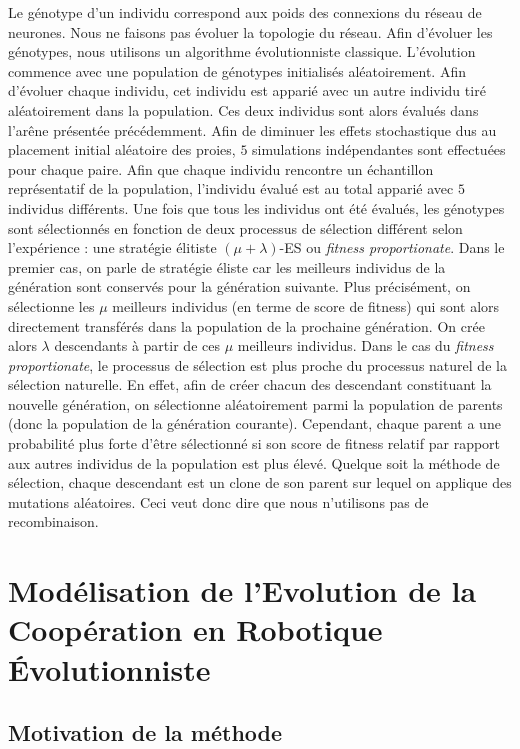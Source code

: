    	Le génotype d'un individu correspond aux poids des connexions du réseau de neurones. Nous ne faisons pas évoluer la topologie du réseau. Afin d'évoluer les génotypes, nous utilisons un algorithme évolutionniste classique. L'évolution commence avec une population de génotypes initialisés aléatoirement. Afin d'évoluer chaque individu, cet individu est apparié avec un autre individu tiré aléatoirement dans la population. Ces deux individus sont alors évalués dans l'arêne présentée précédemment. Afin de diminuer les effets stochastique dus au placement initial aléatoire des proies, $5$ simulations indépendantes sont effectuées pour chaque paire. Afin que chaque individu rencontre un échantillon représentatif de la population, l'individu évalué est au total apparié avec $5$ individus différents. Une fois que tous les individus ont été évalués, les génotypes sont sélectionnés en fonction de deux processus de sélection différent selon l'expérience : une stratégie élitiste \((\mu+\lambda)\)-ES ou \emph{fitness proportionate}. Dans le premier cas, on parle de stratégie éliste car les meilleurs individus de la génération sont conservés pour la génération suivante. Plus précisément, on sélectionne les $\mu$ meilleurs individus (en terme de score de fitness) qui sont alors directement transférés dans la population de la prochaine génération. On crée alors $\lambda$ descendants à partir de ces $\mu$ meilleurs individus. Dans le cas du \emph{fitness proportionate}, le processus de sélection est plus proche du processus naturel de la sélection naturelle. En effet, afin de créer chacun des descendant constituant la nouvelle génération, on sélectionne aléatoirement parmi la population de parents (donc la population de la génération courante). Cependant, chaque parent a une probabilité plus forte d'être sélectionné si son score de fitness relatif par rapport aux autres individus de la population est plus élevé. Quelque soit la méthode de sélection, chaque descendant est un clone de son parent sur lequel on applique des mutations aléatoires. Ceci veut donc dire que nous n'utilisons pas de recombinaison.


\section{Modélisation de l'Evolution de la Coopération en Robotique Évolutionniste}

	\subsection{Motivation de la méthode}
	
